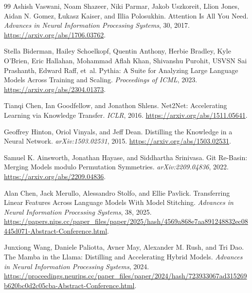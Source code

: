 \begingroup
\raggedright
\begin{thebibliography}{99}
Ashish Vaswani, Noam Shazeer, Niki Parmar, Jakob Uszkoreit, Llion Jones,
Aidan N. Gomez, \L{}ukasz Kaiser, and Illia Polosukhin.
\newblock Attention Is All You Need.
\newblock \emph{Advances in Neural Information Processing Systems}, 30, 2017.
\newblock \url{https://arxiv.org/abs/1706.03762}.

Stella Biderman, Hailey Schoelkopf, Quentin Anthony, Herbie Bradley, Kyle O'Brien,
Eric Hallahan, Mohammad Aflah Khan, Shivanshu Purohit, USVSN Sai Prashanth,
Edward Raff, et~al.
\newblock Pythia: A Suite for Analyzing Large Language Models Across Training and Scaling.
\newblock \emph{Proceedings of ICML}, 2023. \url{https://arxiv.org/abs/2304.01373}.

Tianqi Chen, Ian Goodfellow, and Jonathon Shlens.
\newblock Net2Net: Accelerating Learning via Knowledge Transfer.
\newblock \emph{ICLR}, 2016. \url{https://arxiv.org/abs/1511.05641}.

Geoffrey Hinton, Oriol Vinyals, and Jeff Dean.
\newblock Distilling the Knowledge in a Neural Network.
\newblock \emph{arXiv:1503.02531}, 2015. \url{https://arxiv.org/abs/1503.02531}.

Samuel K. Ainsworth, Jonathan Hayase, and Siddhartha Srinivasa.
\newblock Git Re-Basin: Merging Models modulo Permutation Symmetries.
\newblock \emph{arXiv:2209.04836}, 2022. \url{https://arxiv.org/abs/2209.04836}.

Alan Chen, Jack Merullo, Alessandro Stolfo, and Ellie Pavlick.
\newblock Transferring Linear Features Across Language Models With Model Stitching.
\newblock \emph{Advances in Neural Information Processing Systems}, 38, 2025.
\newblock \url{https://papers.nips.cc/paper_files/paper/2025/hash/4569a868e7aa891248832ec08445d071-Abstract-Conference.html}.

Junxiong Wang, Daniele Paliotta, Avner May, Alexander M. Rush, and Tri Dao.
\newblock The Mamba in the Llama: Distilling and Accelerating Hybrid Models.
\newblock \emph{Advances in Neural Information Processing Systems}, 2024.
\newblock \url{https://proceedings.neurips.cc/paper_files/paper/2024/hash/723933067ad315269b620bc0d2c05cba-Abstract-Conference.html}.


\end{thebibliography}
